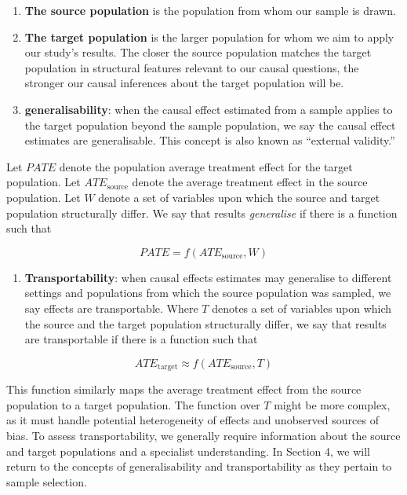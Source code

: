 \documentclass[
  singlecolumn]{article}
\providecommand{\tightlist}{%
  \setlength{\itemsep}{0pt}\setlength{\parskip}{0pt}}\usepackage{longtable,booktabs,array}
\begin{document}
\begin{enumerate}
\def\labelenumi{\arabic{enumi}.}
\item
  \textbf{The source population} is the population from whom our sample
  is drawn.
\item
  \textbf{The target population} is the larger population for whom we
  aim to apply our study's results. The closer the source population
  matches the target population in structural features relevant to our
  causal questions, the stronger our causal inferences about the target
  population will be.
\item
  \textbf{generalisability}: when the causal effect estimated from a
  sample applies to the target population beyond the sample population,
  we say the causal effect estimates are generalisable. This concept is
  also known as ``external validity.''
\end{enumerate}

Let \(PATE\) denote the population average treatment effect for the
target population. Let \(ATE_{\text{source}}\) denote the average
treatment effect in the source population. Let \(W\) denote a set of
variables upon which the source and target population structurally
differ. We say that results \emph{generalise} if there is a function
such that

\[PATE =  f(ATE_{\text{source}}, W)\]

\begin{enumerate}
\def\labelenumi{\arabic{enumi}.}
\setcounter{enumi}{3}
\tightlist
\item
  \textbf{Transportability}: when causal effects estimates may
  generalise to different settings and populations from which the source
  population was sampled, we say effects are transportable. Where \(T\)
  denotes a set of variables upon which the source and the target
  population structurally differ, we say that results are transportable
  if there is a function such that
\end{enumerate}

\[ATE_{\text{target}} \approx f(ATE_{\text{source}}, T)\]

This function similarly maps the average treatment effect from the
source population to a target population. The function over \(T\) might
be more complex, as it must handle potential heterogeneity of effects
and unobserved sources of bias. To assess transportability, we generally
require information about the source and target populations and a
specialist understanding. In Section 4, we will return to the concepts
of generalisability and transportability as they pertain to sample
selection.
\end{document}
